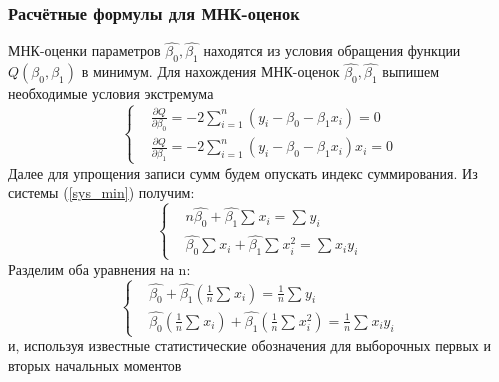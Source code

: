 \documentclass[a4paper]{article}
\begin{document}
            \subsubsection{Расчётные формулы для МНК-оценок}
            \noindent МНК-оценки параметров $\hat{\beta_0}, \hat{\beta_1}$ находятся из условия обращения функции $Q(\beta_0, \beta_1)$ в минимум.
            \newline
            Для нахождения МНК-оценок $\hat{\beta_0}, \hat{\beta_1}$ выпишем необходимые условия экстремума
            \begin{equation}
               \begin{cases}
                 & \frac{\partial Q}{\partial \beta_{0}}  =
                 -2\sum_{i=1}^{n}{(y_{i} - \beta_{0} - \beta_{1}x_{i})} = 0\\
                 & \frac{\partial Q}{\partial \beta_{1}}  =
                 -2\sum_{i=1}^{n}{(y_{i} - \beta_{0} - \beta_{1}x_{i})x_{i}} = 0
               \end{cases}
               \label{sys_min}
            \end{equation}
            Далее для упрощения записи сумм будем опускать индекс суммирования. Из системы (\ref{sys_min}) получим:
            \begin{equation}
               \begin{cases}
                 & n\hat{\beta_{0}} + \hat{\beta_{1}}\sum_{}{}{x_{i}} =
                 \sum_{}{}{y_{i}}\\
                & \hat{\beta_{0}}\sum_{}{}{x_{i}} + \hat{\beta_{1}}\sum_{}{}{x_{i}^{2}} = \sum_{}{}{x_{i}y_{i}}
               \end{cases}
               \label{sys_2}
            \end{equation}
            Разделим оба уравнения на n:
            \begin{equation}
               \begin{cases}
                 & \hat{\beta_{0}} + \hat{\beta_{1}}(\frac{1}{n}\sum_{}{}{x_{i}}) =
                 \frac{1}{n}\sum_{}{}{y_{i}}\\
                & \hat{\beta_{0}}(\frac{1}{n}\sum_{}{}{x_{i}}) + \hat{\beta_{1}}(\frac{1}{n}\sum_{}{}{x_{i}^{2}}) = \frac{1}{n}\sum_{}{}{x_{i}y_{i}}
               \end{cases}
               \label{sys_3}
            \end{equation}
            и, используя известные статистические обозначения для выборочных первых и вторых начальных моментов
\end{document}
